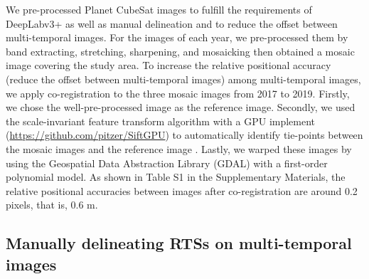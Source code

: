 \documentclass[authoryear,preprint,review,12pt]{elsarticle}
\begin{document}
We pre-processed Planet CubeSat images to fulfill the requirements of DeepLabv3+ as well as manual delineation and to reduce the offset between multi-temporal images. 
For the images of each year, we pre-processed them by band extracting, stretching, sharpening, and mosaicking then obtained a mosaic image covering the study area. 
To increase the relative positional accuracy (reduce the offset between multi-temporal images) among multi-temporal images, we apply co-registration to the three mosaic images from 2017 to 2019. 
Firstly, we chose the well-pre-processed image \citep{huang2020using} as the reference image. 
Secondly, we used the scale-invariant feature transform algorithm \citep{lowe2004distinctive} with a GPU implement (\url{https://github.com/pitzer/SiftGPU}) to automatically identify tie-points between %
the mosaic images and the reference image \citep{huang2016a}. 
Lastly, we warped these images by using the Geospatial Data Abstraction Library (GDAL) with a first-order polynomial model.
As shown in Table S1 in the Supplementary Materials, the relative positional accuracies between images after co-registration are around 0.2 pixels, that is, 0.6 m. 



\subsection{Manually delineating RTSs on multi-temporal images}
\label{sec_manu_delineating}
\end{document}
